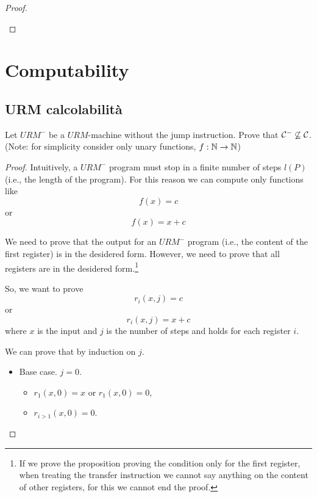 \documentclass[12pt,a4paper,oneside]{book}
\begin{document}
\begin{exercise}
\begin{proof}
\begin{itemize}
        \end{itemize}
    \end{proof}
\end{exercise}


\chapter{Computability}

\section{URM calcolabilità}

\begin{exercise}
    Let $URM^-$ be a $URM$-machine without the jump instruction.
    Prove that $\mathcal{C}^- \not\subseteq \mathcal{C}$. (Note: for simplicity consider only unary functions, $f: \mathbb{N} \to \mathbb{N}$)
    
    \begin{proof}
        Intuitively, a $URM^-$ program must stop in a finite number of steps $l(P)$ (i.e., the length of the program).
        For this reason we can compute only functions like
        \[
        f(x) = c
        \]
        or
        \[
        f(x) = x + c
        \]
        
        We need to prove that the output for an $URM^-$ program (i.e., the content of the first register) is in the desidered form.
        However, we need to prove that all registers are in the desidered form.\footnote{If we prove the proposition proving the condition only for the first register, when treating the transfer instruction we cannot say anything on the content of other registers, for this we cannot end the proof.}
        
        So, we want to prove
        \[ r_i(x, j) = c \]
        or
        \[ r_i(x, j) = x + c \]
        where $x$ is the input and $j$ is the number of steps and holds for each register $i$.
        
        We can prove that by induction on $j$.
        
        \begin{itemize}
            \item Base case. $j = 0$. 
            \begin{itemize}
                \item $r_1(x, 0) = x$ or $r_1(x, 0) = 0$,
                \item $r_{i > 1} (x, 0) = 0$.
            \end{itemize}
            

\end{itemize}
\end{proof}
\end{exercise}
\end{document}
